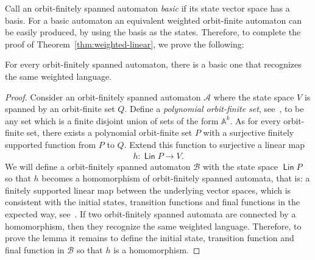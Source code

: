 \documentclass[10pt,a4paper]{amsart}
\numberwithin{equation}{section}
\newcommand{\Aa}{{\mathcal A}}
\newcommand{\Bb}{{\mathcal B}}
\newcommand{\atoms}{\mathbb A}
\DeclareMathOperator{\lin}{\mathsf{Lin}}
\begin{document}
Call an orbit-finitely spanned automaton {\em basic} if its state vector space has a basis.
For a basic automaton an equivalent weighted orbit-finite automaton can be easily produced, by using the basis as the states.  Therefore, to complete the proof of Theorem~\ref{thm:weighted-linear}, we prove the following:
\begin{lemma}\label{lem:basic-recognize-same-languages}
    For every orbit-finitely spanned automaton, there is a basic one that  recognizes the same weighted language.
\end{lemma}
\begin{proof}
    Consider an orbit-finitely spanned automaton $\Aa$ where the state space $V$ is spanned by an  orbit-finite set $Q$. Define a \emph{polynomial orbit-finite  set}, see~\cite[Definition 1]{bojanczykSingleUseRegister2019},  to be any set which is  a finite disjoint union of sets of the form $\atoms^k$.  As for every orbit-finite set, there exists a  polynomial orbit-finite set $P$ with a surjective finitely supported function from $P$ to $Q$.
    Extend this function  to surjective a linear map
    \begin{align*}
    h : \lin P \to V.
    \end{align*}
     We will define a orbit-finitely spanned automaton $\Bb$ with the state space $\lin P$ so that $h$ becomes a homomorphism  of orbit-finitely spanned automata, that is: a finitely supported linear map between the underlying vector spaces, which is consistent with the initial states, transition functions and final functions in the expected way, see~\cite[Sec.~6.2]{bojanczyk_slightly2018}. If two orbit-finitely spanned automata are connected by a homomorphism, then they recognize the same weighted language.
     Therefore, to prove the lemma it remains to define the initial state, transition function and final function in $\Bb$ so that $h$ is a homomorphism.


\end{proof}
\end{document}
